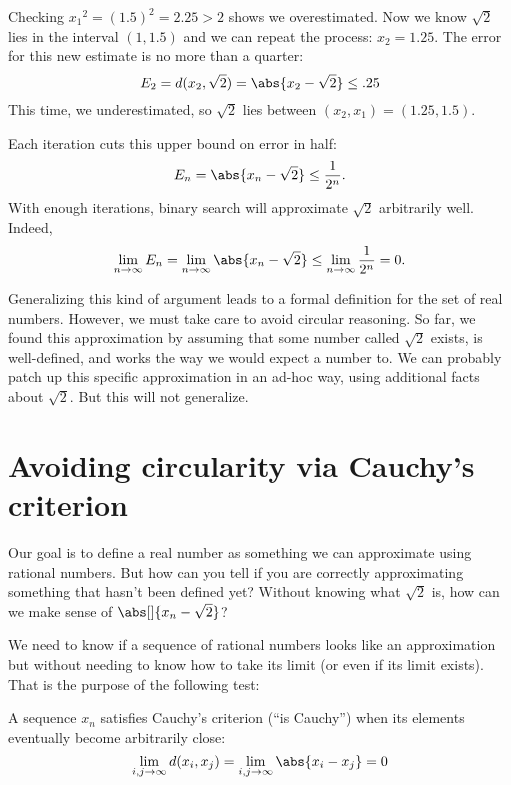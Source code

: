 \documentclass{scrartcl}
\newcommand{\dist}{d}
\begin{document}
Checking \({x_{1}}^{2}=(1.5)^{2} = 2.25 > 2\) shows we overestimated. Now we know \(\sqrt 2\) lies in the interval \((1, 1.5)\) and we can repeat the process: \(x_{2} = 1.25\). The error for this new estimate is no more than a quarter:
\[
  E_{2} = \dist(x_{2},\sqrt 2) = \abs{x_{2}-\sqrt 2} \leq .25
\]
This time, we underestimated, so \(\sqrt 2\)  lies between \((x_{2},x_{1})=(1.25,1.5)\).

Each iteration cuts this upper bound on error in half:
\[
  E_{n} = \abs{x_{n}-\sqrt{2}} \leq \frac{1}{2^{n}}.
\]
With enough iterations, binary search will approximate \(\sqrt 2\) arbitrarily well. Indeed,
\[
  \lim_{{n\to\infty}} E_{n} = \lim_{n\to\infty} \abs{x_{n}-\sqrt 2} \leq \lim_{{n\to\infty}} \frac{1}{2^{n}} = 0.
\]

Generalizing this kind of argument leads to a formal definition for the set of real numbers. However, we must take care to avoid circular reasoning. So far, we found this approximation by assuming that some number called \(\sqrt 2\) exists, is well-defined, and works the way we would expect a number to. We can probably patch up this specific approximation in an ad-hoc way, using additional facts about \(\sqrt 2\). But this will not generalize.

\section{Avoiding circularity via Cauchy's criterion}
Our goal is to define a real number as something we can approximate using rational numbers. But how can you tell if you are correctly approximating something that hasn't been defined yet?
Without knowing what \(\sqrt 2\) is, how can we make sense of \(\abs[]{x_{n}-\sqrt 2}\)?

We need to know if a sequence of rational numbers looks like an approximation but without needing to know how to take its limit (or even if its limit exists). That is the purpose of the following test:
\begin{defn}\label{Cauchy's criterion}
  A sequence \(x_{n}\) satisfies Cauchy's criterion (``is Cauchy'') when its elements eventually become arbitrarily close:
  \[
    \lim_{i,j\to\infty} d(x_{i},x_{j})=\lim_{i,j\to \infty} \abs{x_{i}-x_{j}} =0
  \]
\end{defn}
\end{document}
